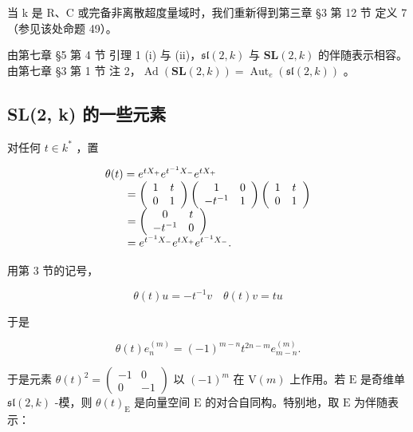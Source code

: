 当 k 是 R、C 或完备非离散超度量域时，我们重新得到第三章 §3 第 12 节 定义 7（参见该处命题 49）。

由第七章 §5 第 4 节 引理 1 (i) 与 (ii)，\(\mathfrak{sl}(2,k)\) 与 \(\mathbf{SL}(2,k)\) 的伴随表示相容。由第七章 §3 第 1 节 注 2，\(\operatorname{Ad}(\mathbf{SL}(2,k)) = \operatorname{Aut}_e(\mathfrak{sl}(2,k))\) 。

\subsection{SL(2, k) 的一些元素}

对任何 \(t\in k^{*}\) ，置

\[
\begin{array}{l} \theta (t) = e ^ {t X _ {+}} e ^ {t ^ {- 1} X _ {-}} e ^ {t X _ {+}} \\ \qquad = \left( \begin{array}{c c} 1 & t \\ 0 & 1 \end{array} \right) \left( \begin{array}{c c} 1 & 0 \\ - t ^ {- 1} & 1 \end{array} \right) \left( \begin{array}{c c} 1 & t \\ 0 & 1 \end{array} \right) \\ \qquad = \left( \begin{array}{c c} 0 & t \\ - t ^ {- 1} & 0 \end{array} \right) \\ \qquad = e ^ {t ^ {- 1} X _ {-}} e ^ {t X _ {+}} e ^ {t ^ {- 1} X _ {-}}. \end{array}
\]

用第 3 节的记号，

\[
\theta (t) u = - t ^ {- 1} v \quad \theta (t) v = t u
\]

于是

\[
\theta (t) e _ {n} ^ {(m)} = (- 1) ^ {m - n} t ^ {2 n - m} e _ {m - n} ^ {(m)}.\tag{4}
\]

于是元素 \(\theta(t)^2 = \left( \begin{array}{cc} -1 & 0 \\ 0 & -1 \end{array} \right)\) 以 \((-1)^m\) 在 \(\mathrm{V}(m)\) 上作用。若 \(\mathrm{E}\) 是奇维单 \(\mathfrak{sl}(2,k)\) -模，则 \(\theta(t)_{\mathrm{E}}\) 是向量空间 \(\mathrm{E}\) 的对合自同构。特别地，取 \(\mathrm{E}\) 为伴随表示：

